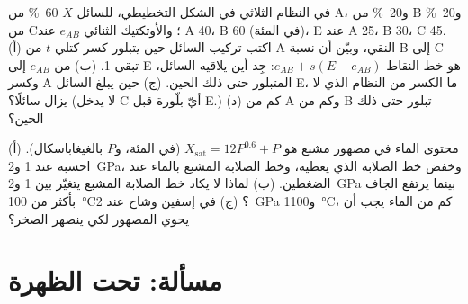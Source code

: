 \begin{exercise}[$\star\star\star$]\label{exo:b2:mantle-melting:11}
في النظام الثلاثي في الشكل التخطيطي، للسائل $X$
\qty{60}{\percent} من A، و\qty{20}{\percent} من B و\qty{20}{\percent} من C؛
والأوتكتيك الثنائي $e_{AB}$ عند A 40، B 60 (في المئة)،  E عند
A 25، B 30، C 45. (أ) اكتب تركيب السائل حين يتبلور كسر كتلي $t$
من A النقي، وبيّن أن نسبة B إلى C تبقى 1. (ب)  من $e_{AB}$ إلى E هو خط النقاط $e_{AB} + s(E - e_{AB})$: جِد
أين يلاقيه السائل، وكسر A المتبلور حتى ذلك الحين. (ج) حين
يبلغ السائل E، ما الكسر من النظام الذي لا يزال سائلًا؟ (لا يدخل C أيّ
بلّورة قبل E.) (د) كم من A وكم من B تبلور حتى ذلك الحين؟
\end{exercise}

\begin{exercise}[$\star\star\star$]\label{exo:b2:mantle-melting:12}
محتوى الماء في مصهور مشبع هو $X_{\mathrm{sat}} = 12P^{0.6} + P$
(في المئة، و$P$ بالغيغاباسكال). (أ) احسبه عند 1 و\qty{2}{GPa}، وخفض خط الصلابة
الذي يعطيه، وخط الصلابة المشبع بالماء عند الضغطين. (ب) لماذا لا يكاد
خط الصلابة المشبع يتغيّر بين 1 و\qty{2}{GPa} بينما يرتفع الجاف
بأكثر من \qty{100}{\celsius}؟ (ج) في إسفين وشاح عند \qty{2}{GPa}
و\qty{1100}{\celsius}، كم من الماء يجب أن يحوي المصهور لكي ينصهر الصخر؟
\end{exercise}

\section{مسألة: تحت الظهرة}

